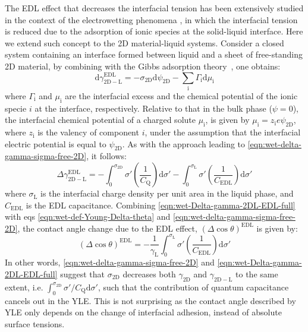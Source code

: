 The EDL effect that decreases the interfacial tension has been
extensively studied in the context of the electrowetting phenomena
\cite{Mugele_2005_EW_rev}, in which the interfacial tension is reduced due to
the adsorption of ionic species at the solid-liquid interface.
%
Here we
extend such concept to the 2D material-liquid systems.
%
Consider a
closed system containing an interface formed between liquid and a
sheet of free-standing 2D material, by combining with the Gibbs
adsorption theory~\cite{Bard_1980_electrochem_book}, one obtains:
\begin{equation}
\label{eq:wet-gibbs}
\mathrm{d} \gamma_{\mathrm{2D-L}}^{\mathrm{EDL}} = -\sigma_{\mathrm{2D}} \mathrm{d} \psi_{\mathrm{2D}}
                                                   -\sum_{\mathrm{i}} \Gamma_{\mathrm{i}} \mathrm{d}\mu_{\mathrm{i}}
\end{equation}
where \(\Gamma_{\mathrm{i}}\) and \(\mu_{\mathrm{i}}\) are the interfacial
excess and the chemical potential of the ionic specie \(i\) at the
interface, respectively. Relative to that in the bulk phase
(\(\psi=0\)), the interfacial chemical potential of a charged solute
\(\mu_{\mathrm{i}}\), is given by
\(\mu_{\mathrm{i}}=z_{\mathrm{i}}e\psi_{\mathrm{2D}}\), where
\(z_{\mathrm{i}}\) is the valency of component \(i\), under the assumption
that the interfacial electric potential is equal to
\(\psi_{\mathrm{2D}}\). As with the approach leading to
\autoref{eqn:wet-delta-gamma-sigma-free-2D}, it follows:
\begin{equation}
\label{eqn:wet-Delta-gamma-2DL-EDL-full}
\Delta \gamma_{\mathrm{2D-L}}^{\mathrm{EDL}} = 
-\int_{0}^{\sigma_{\mathrm{2D}}} \sigma' \left(\frac{1}{C_{\mathrm{Q}}}\right) \mathrm{d}\sigma'
-\int_{0}^{\sigma_{\mathrm{L}}} \sigma' \left(\frac{1}{C_{\mathrm{EDL}}}\right) \mathrm{d}\sigma'
\end{equation}
where \(\sigma_{\mathrm{L}}\) is the interfacial charge density per unit
area in the liquid phase, and \(C_{\mathrm{EDL}}\) is the EDL
capacitance.
%
Combining \autoref{eqn:wet-Delta-gamma-2DL-EDL-full} with eqs
\autoref{eqn:wet-def-Young-Delta-theta} and \autoref{eqn:wet-delta-gamma-sigma-free-2D},
the contact angle change due to the EDL effect, \((\Delta \cos
\theta)^{\mathrm{EDL}}\) is given by:
\begin{equation}
\label{eqn:wet-Delta-cos-EDL}
(\Delta \cos \theta)^{\mathrm{EDL}} = -\frac{1}{\gamma_{\mathrm{L}}}
                                      \int_{0}^{\sigma_{\mathrm{L}}} \sigma' 
                                      \left(\frac{1}{C_{\mathrm{EDL}}}\right) \mathrm{d}\sigma'
\end{equation}
In other words, \autoref{eqn:wet-delta-gamma-sigma-free-2D} and
\autoref{eqn:wet-Delta-gamma-2DL-EDL-full} suggest that \(\sigma_{\mathrm{2D}}\)
decreases both \(\gamma_{\mathrm{2D}}\) and \(\gamma_{\mathrm{2D-L}}\) to
the same extent, i.e. \(\int_{0}^{\sigma_{\mathrm{2D}}}
\sigma'/C_{\mathrm{Q}} \mathrm{d}\sigma'\), such that the contribution
of quantum capacitance cancels out in the YLE.
%
This is not surprising as the contact angle described by YLE only
depends on the change of interfacial adhesion, instead of absolute
surface tensions.


